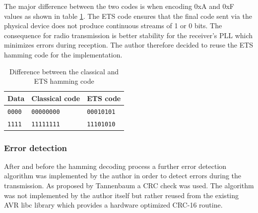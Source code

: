 The major difference between the two codes is when encoding 0xA and 0xF values as shown in table \ref{tab:hamming_diff}. The ETS code ensures that the final code sent via the physical device does not produce continuous streams of 1 or 0 bits. The consequence for radio transmission is better stability for the receiver's PLL which minimizes errors during reception. The author therefore decided to reuse the ETS hamming code for the implementation.

\begin{table}[H]
\centering
\begin{tabular}{l | l | l}
Data & Classical code & ETS code \\
\hline
\texttt{0000} & \texttt{00000000} & \texttt{00010101} \\
\texttt{1111} & \texttt{11111111} & \texttt{11101010} \\
\end{tabular}
\caption{Difference between the classical and ETS hamming code}
\label{tab:hamming_diff}
\end{table}

\subsubsection{Error detection}
After and before the hamming decoding process a further error detection algorithm was implemented by the author in order to detect errors during the transmission. As proposed by Tannenbaum a CRC check was used. The algorithm was not implemented by the author itself but rather reused from the existing AVR libc library which provides a hardware optimized CRC-16 routine.

